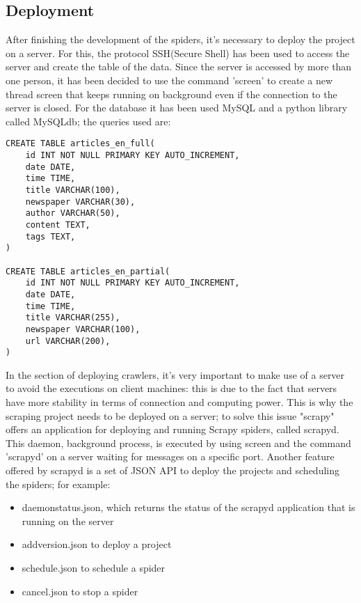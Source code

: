 \subsection{Deployment}
After finishing the development of the spiders, it's necessary to deploy the project on a server. 
For this, the protocol SSH(Secure Shell)\cite{ssh} has been used to access the server and create the table of the data.
Since the server is accessed by more than one person, it has been decided to use the command 'screen' to create a new thread screen that keeps running on background even if the connection to the server is closed. For the database it has been used MySQL and a python library called MySQLdb; the queries used are:
\begin{verbatim}
CREATE TABLE articles_en_full(
    id INT NOT NULL PRIMARY KEY AUTO_INCREMENT,
    date DATE,
    time TIME,
    title VARCHAR(100),
    newspaper VARCHAR(30),
    author VARCHAR(50),
	content TEXT,
    tags TEXT,
)

CREATE TABLE articles_en_partial(
    id INT NOT NULL PRIMARY KEY AUTO_INCREMENT,
    date DATE,
    time TIME,
    title VARCHAR(255),
    newspaper VARCHAR(100),
    url VARCHAR(200),
)
\end{verbatim} 
In the section of deploying crawlers, it's very important to make use of a server to avoid the executions on client machines: this is due to the fact that servers have more stability in terms of connection and computing power. 
This is why the scraping project needs to be deployed on a server; to solve this issue "scrapy" offers an application for deploying and running Scrapy spiders, called scrapyd\cite{scrapyd}. 
This daemon, background process, is executed by using screen and the command 'scrapyd' on a server waiting for messages on a specific port. 
Another feature offered by scrapyd is a set of JSON API to deploy the projects and scheduling the spiders; for example:
\begin{itemize}
	\item daemonstatus.json, which returns the status of the scrapyd application that is running on the server
	\item addversion.json to deploy a project
	\item schedule.json to schedule a spider
	\item cancel.json to stop a spider
\end{itemize}
